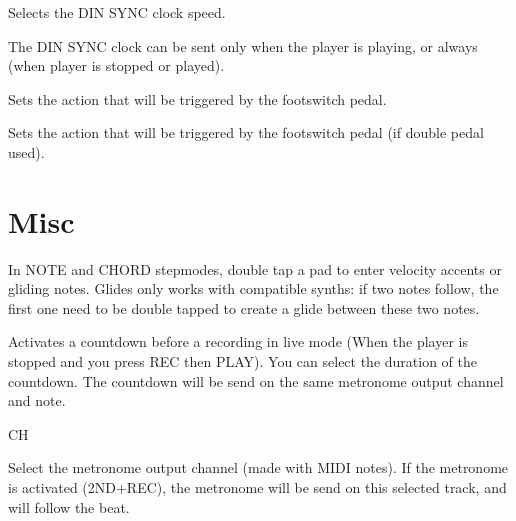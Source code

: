           

Selects the DIN SYNC clock speed.

  

The DIN SYNC clock can be sent only when the player is playing, or always (when player is stopped or played).

   

Sets the action that will be triggered by the footswitch pedal.

   

Sets the action that will be triggered by the footswitch pedal (if double pedal used).


\section{Misc}

  

In NOTE and CHORD stepmodes, double tap a pad to enter velocity accents or gliding notes. Glides only works with compatible synths: if two notes follow, the first one need to be double tapped to create a glide between these two notes.

     

Activates a countdown before a recording in live mode (When the player is stopped and you press REC then PLAY). You can select the duration of the countdown. The countdown will be send on the same metronome output channel and note.

 CH    \settingopt{\ldots} 

Select the metronome output channel (made with MIDI notes). If the metronome is activated (2ND+REC), the metronome will be send on this selected track, and will follow the beat.

  

